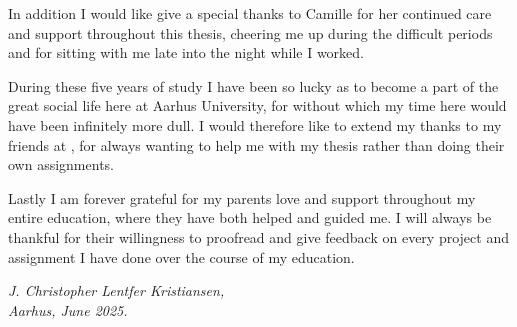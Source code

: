 In addition I would like give a special thanks to Camille for her continued care and support throughout this thesis, cheering me up during the difficult periods and for sitting with me late into the night while I worked.

During these five years of study I have been so lucky as to become a part of the great social life here at Aarhus University, for without which my time here would have been infinitely more dull. I would therefore like to extend my thanks to my friends at \TKET, for always wanting to help me with my thesis rather than doing their own assignments.

Lastly I am forever grateful for my parents love and support throughout my entire education, where they have both helped and guided me. I will always be thankful for their willingness to proofread and give feedback on every project and assignment I have done over the course of my education. 

\begin{FlushRight}
	\textit{J. Christopher Lentfer Kristiansen,} \\
	\textit{Aarhus, June 2025.}
\end{FlushRight}
